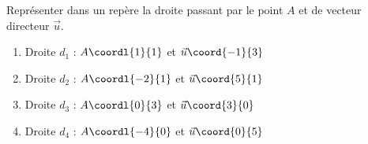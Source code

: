 \begin{exo}{}
	Représenter dans un repère la droite passant par le point $A$ et de vecteur directeur $\vec{u}$.
	\begin{enumerate}
		\item Droite $d_1$ : $A\coordl{1}{1}$ et $\vec{u}\coord{-1}{3}$
		\item Droite $d_2$ : $A\coordl{-2}{1}$ et $\vec{u}\coord{5}{1}$
		\item Droite $d_3$ : $A\coordl{0}{3}$ et $\vec{u}\coord{3}{0}$
		\item Droite $d_4$ : $A\coordl{-4}{0}$ et $\vec{u}\coord{0}{5}$
	\end{enumerate}
\end{exo}
